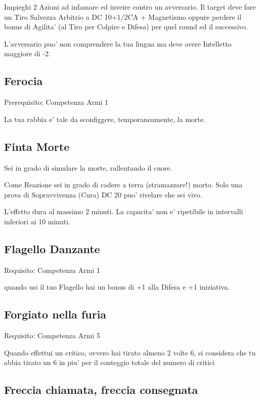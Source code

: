 \documentclass[a4paper,11pt,twoside,openany]{book}
\begin{document}
Impieghi 2 Azioni ad infamare ed inveire contro un avversario. Il target deve fare un Tiro Salvezza Arbitrio a DC 10+1/2CA + Magnetismo oppure perdere il bonus di Agilita' (al Tiro per Colpire e Difesa) per quel round ed il successivo.

L'avversario puo' non comprendere la tua lingua ma deve avere Intelletto maggiore di -2.

\subsection{Ferocia}

Prerequisito; Competenza Armi 1

La tua rabbia e' tale da sconfiggere, temporaneamente, la morte.

\subsection{Finta Morte}

Sei in grado di simulare la morte, rallentando il cuore.

Come Reazione sei in grado di cadere a terra (stramazzare!) morto. Solo una prova di Sopravvivenza (Cura) DC 20 puo' rivelare che sei vivo.

L'effetto dura al massimo 2 minuti. La capacita' non e' ripetibile in intervalli inferiori ai 10 minuti.

\subsection{Flagello Danzante}

Requisito: Competenza Armi 1

quando usi il tuo Flagello hai un bonus di +1 alla Difesa e +1 iniziativa.

\subsection{Forgiato nella furia}

Requisito: Competenza Armi 5

Quando effettui un critico, ovvero hai tirato almeno 2 volte 6, si considera che tu abbia tirato un 6 in piu' per il conteggio totale del numero di critici

\subsection{Freccia chiamata, freccia consegnata}
\end{document}
